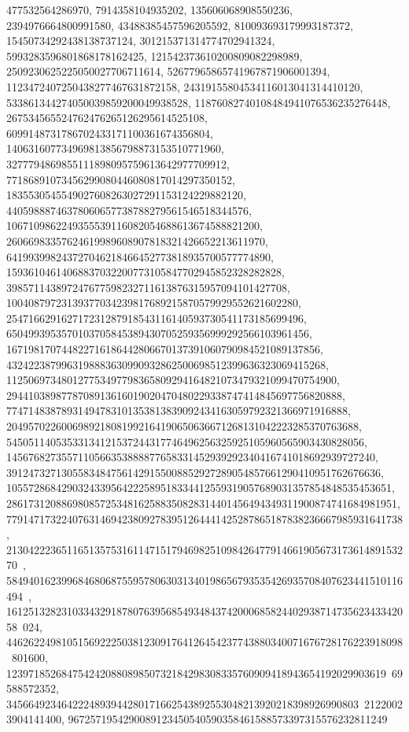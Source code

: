 {{{   477532564286970, 7914358104935202, 135606068908550236, 
   2394976664800991580, 43488385457596205592, 810093693179993187372, 
   15450734292438138737124, 301215371314774702941324, 
   5993283596801868178162425, 121542373610200809082298989, 
   2509230625225050027706711614, 52677965865741967871906001394, 
   1123472407250438277467631872158, 24319155804534116013041314410120, 
   533861344274050039859200049938528, 11876082740108484941076536235276448, 
   267534565524762476265126295614525108, 
   6099148731786702433171100361674356804, 
   140631607734969813856798873153510771960, 
   3277794869855111898095759613642977709912, 
   77186891073456299080446080817014297350152, 
   1835530545549027608263027291153124229882120, 
   44059888746378060657738788279561546518344576, 
   1067109862249355539116082054688613674588821200, 
   26066983357624619989608907818321426652213611970, 
   641993998243727046218466452773818935700577774890, 
   15936104614068837032200773105847702945852328282828, 
   398571143897247677598232711613876315957094101427708, 
   10040879723139377034239817689215870579929552621602280, 
   254716629162717231287918543116140593730541173185699496, 
   6504993953570103705845389430705259356999292566103961456, 
   167198170744822716186442806670137391060790984521089137856, 
   4324223879963198883630990932862500698512399636323069415268, 
   112506973480127753497798365809294164821073479321099470754900, 
   2944103898778708913616019020470480229338747414845697756820888, 
   77471483878931494783101353813839092434163059792321366971916888, 
   2049570226006989218081992164190650636671268131042223285370763688, 
   54505114053533134121537244317746496256325925105960565903430828056, 
   1456768273557110566353888877658331452939292340416741018692939727240, 
   39124732713055834847561429155008852927289054857661290410951762676636, 
   1055728684290324339564222589518334412559319057689031357854848535453651, 
   28617312088698085725348162588350828314401456494349311900874741684981951, 
   779147173224076314694238092783951264441425287865187838236667985931641738, 
   21304222365116513575316114715179469825109842647791466190567317361489153270\
, 
   584940162399684680687559578063031340198656793535426935708407623441510116494\
, 
   16125132823103343291878076395685493484374200068582440293871473562343342058\
024, 446262249810515692225038123091764126454237743880340071676728176223918098\
801600, 123971852684754242088089850732184298308335760909418943654192029903619\
69588572352, 3456649234642224893944280171662543892553048213920218398926990803\
21220023904141400, 9672571954290089123450540590358461588573397315576232811249\
}}}
